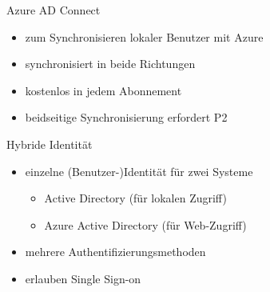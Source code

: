 

\begin{flashcard}[Definition]{Azure AD Connect}
    \begin{itemize}
        \item zum Synchronisieren lokaler Benutzer mit Azure
        \item synchronisiert in beide Richtungen
        \item kostenlos in jedem Abonnement
        \item beidseitige Synchronisierung erfordert P2
    \end{itemize}
\end{flashcard}

\begin{flashcard}[Definition]{Hybride Identität}
    \begin{itemize}
        \item einzelne (Benutzer-)Identität für zwei Systeme
            \begin{itemize}
                \item Active Directory (für lokalen Zugriff)
                \item Azure Active Directory (für Web-Zugriff)
            \end{itemize}
        \item mehrere Authentifizierungsmethoden
        \item[$\Rightarrow$] erlauben Single Sign-on
    \end{itemize}
\end{flashcard}

